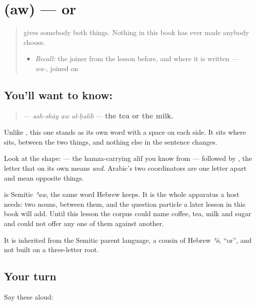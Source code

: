 \section[\texorpdfstring{\ar{أو} (aw)}{أو (aw)}]{ (aw) — or}

\label{lesson:AR-C38-aw}



\begin{quote}
\textbf{} gives somebody both things. Nothing in this book has ever made anybody choose.

\begin{itemize}
\raggedright
  \item \emph{Recall:} the joiner from the lesson before, and where it is written — \emph{wa-}, joined on
\end{itemize}
\end{quote}

\subsection*{You'll want to know: }
\begin{quote}
\textbf{  } — \emph{ash-shāy aw al-ḥalīb} — \textbf{the tea or the milk.}
\end{quote}

Unlike \textbf{}, this one stands as its own word with a space on each side. It sits where \textbf{} sits, between the two things, and nothing else in the sentence changes.

Look at the shape: \textbf{} — the hamza-carrying alif you know from \textbf{} — followed by \textbf{}, the letter that on its own means \emph{and}. Arabic's two coordinators are one letter apart and mean opposite things.

\begin{cousinweb}
\textbf{} is Semitic \emph{ʾaw}, the same word Hebrew keeps. It is the whole apparatus a host needs: two nouns, \textbf{} between them, and the question particle a later lesson in this book will add. Until this lesson the corpus could name coffee, tea, milk and sugar and could not offer any one of them against another.

It is inherited from the Semitic parent language, a cousin of Hebrew \emph{ʾō}, \textquotedblleft{}or\textquotedblright{}, and not built on a three-letter root.
\end{cousinweb}

\subsection*{Your turn}
Say these aloud:

